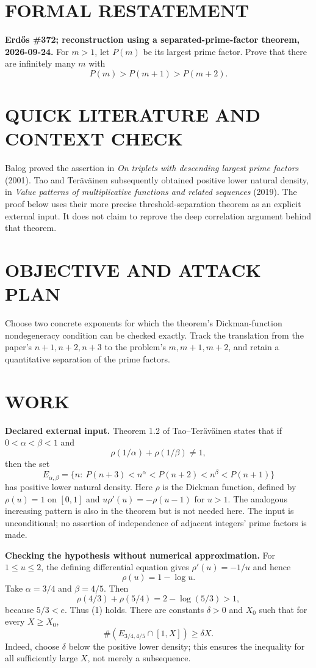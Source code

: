 \section{FORMAL RESTATEMENT}
\textbf{Erd\H{o}s \#372; reconstruction using a separated-prime-factor theorem, 2026-09-24.}
For $m>1$, let $P(m)$ be its largest prime factor. Prove that there are infinitely many $m$ with
\[
P(m)>P(m+1)>P(m+2).
\]

\section{QUICK LITERATURE AND CONTEXT CHECK}
Balog proved the assertion in \emph{On triplets with descending largest prime factors} (2001). Tao and Ter\"av\"ainen subsequently obtained positive lower natural density, in \emph{Value patterns of multiplicative functions and related sequences} (2019). The proof below uses their more precise threshold-separation theorem as an explicit external input. It does not claim to reprove the deep correlation argument behind that theorem.

\section{OBJECTIVE AND ATTACK PLAN}
Choose two concrete exponents for which the theorem's Dickman-function nondegeneracy condition can be checked exactly. Track the translation from the paper's $n+1,n+2,n+3$ to the problem's $m,m+1,m+2$, and retain a quantitative separation of the prime factors.

\section{WORK}
\textbf{Declared external input.} Theorem 1.2 of Tao--Ter\"av\"ainen states that if $0<\alpha<\beta<1$ and
\[
\rho(1/\alpha)+\rho(1/\beta)\ne1,                            \tag{1}
\]
then the set
\[
E_{\alpha,\beta}=\{n:\ P(n+3)<n^\alpha<P(n+2)<n^\beta<P(n+1)\}
\]
has positive lower natural density. Here $\rho$ is the Dickman function, defined by $\rho(u)=1$ on $[0,1]$ and $u\rho'(u)=-\rho(u-1)$ for $u>1$. The analogous increasing pattern is also in the theorem but is not needed here. The input is unconditional; no assertion of independence of adjacent integers' prime factors is made.

\textbf{Checking the hypothesis without numerical approximation.} For $1\leq u\leq2$, the defining differential equation gives $\rho'(u)=-1/u$ and hence
\[
\rho(u)=1-\log u.
\]
Take $\alpha=3/4$ and $\beta=4/5$. Then
\[
\rho(4/3)+\rho(5/4)=2-\log(5/3)>1,
\]
because $5/3<e$. Thus (1) holds. There are constants $\delta>0$ and $X_0$ such that for every $X\geq X_0$,
\[
\#(E_{3/4,4/5}\cap[1,X])\geq\delta X.                    \tag{2}
\]
Indeed, choose $\delta$ below the positive lower density; this ensures the inequality for all sufficiently large $X$, not merely a subsequence.

